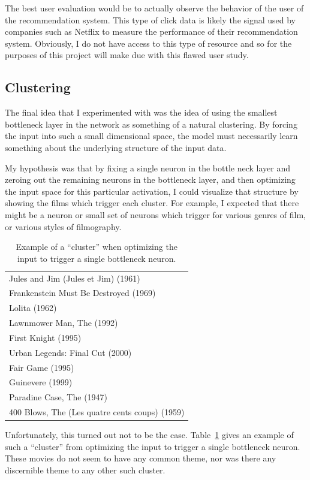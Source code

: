 \documentclass[12pt]{article}
\begin{document}
The best user evaluation would be to actually observe the behavior of the
user of the recommendation system.
This type of click data is likely the signal used by companies such as Netflix
to measure the performance of their recommendation system.
Obviously, I do not have access to this type of resource and so for the
purposes of this project will make due with this flawed user study.

\subsection{Clustering}

The final idea that I experimented with was the idea of using the smallest
bottleneck layer in the network as something of a natural clustering.
By forcing the input into such a small dimensional space, the model must
necessarily learn something about the underlying structure of the input data.

My hypothesis was that by fixing a single neuron in the bottle neck layer and
zeroing out the remaining neurons in the bottleneck layer, and then optimizing
the input space for this particular activation, I could visualize that
structure by showing the films which trigger each cluster.
For example, I expected that there might be a neuron or small set of neurons
which trigger for various genres of film, or various styles of filmography.

\begin{table}
\centering
\begin{tabular}{|l|}
\hline
Jules and Jim (Jules et Jim) (1961)\\
Frankenstein Must Be Destroyed (1969)\\
Lolita (1962)\\
Lawnmower Man, The (1992)\\
First Knight (1995)\\
Urban Legends: Final Cut (2000)\\
Fair Game (1995)\\
Guinevere (1999)\\
Paradine Case, The (1947)\\
400 Blows, The (Les quatre cents coups) (1959)\\
\hline
\end{tabular}
\caption{Example of a ``cluster'' when optimizing the input to trigger a single
bottleneck neuron.}
\label{tab:cluster}
\end{table}

Unfortunately, this turned out not to be the case.
Table~\ref{tab:cluster} gives an example of such a ``cluster'' from optimizing
the input to trigger a single bottleneck neuron.
These movies do not seem to have any common theme, nor was there any
discernible theme to any other such cluster.
\end{document}

